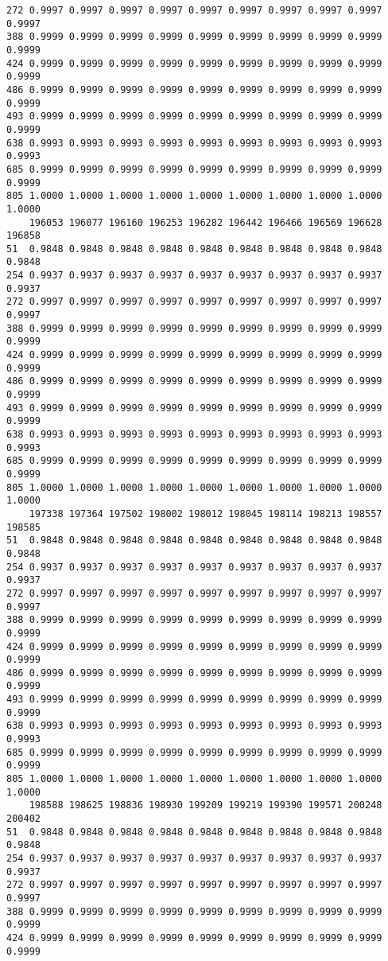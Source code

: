 \documentclass[
]{report}
\begin{document}
\begin{verbatim}
272 0.9997 0.9997 0.9997 0.9997 0.9997 0.9997 0.9997 0.9997 0.9997 0.9997
388 0.9999 0.9999 0.9999 0.9999 0.9999 0.9999 0.9999 0.9999 0.9999 0.9999
424 0.9999 0.9999 0.9999 0.9999 0.9999 0.9999 0.9999 0.9999 0.9999 0.9999
486 0.9999 0.9999 0.9999 0.9999 0.9999 0.9999 0.9999 0.9999 0.9999 0.9999
493 0.9999 0.9999 0.9999 0.9999 0.9999 0.9999 0.9999 0.9999 0.9999 0.9999
638 0.9993 0.9993 0.9993 0.9993 0.9993 0.9993 0.9993 0.9993 0.9993 0.9993
685 0.9999 0.9999 0.9999 0.9999 0.9999 0.9999 0.9999 0.9999 0.9999 0.9999
805 1.0000 1.0000 1.0000 1.0000 1.0000 1.0000 1.0000 1.0000 1.0000 1.0000
    196053 196077 196160 196253 196282 196442 196466 196569 196628 196858
51  0.9848 0.9848 0.9848 0.9848 0.9848 0.9848 0.9848 0.9848 0.9848 0.9848
254 0.9937 0.9937 0.9937 0.9937 0.9937 0.9937 0.9937 0.9937 0.9937 0.9937
272 0.9997 0.9997 0.9997 0.9997 0.9997 0.9997 0.9997 0.9997 0.9997 0.9997
388 0.9999 0.9999 0.9999 0.9999 0.9999 0.9999 0.9999 0.9999 0.9999 0.9999
424 0.9999 0.9999 0.9999 0.9999 0.9999 0.9999 0.9999 0.9999 0.9999 0.9999
486 0.9999 0.9999 0.9999 0.9999 0.9999 0.9999 0.9999 0.9999 0.9999 0.9999
493 0.9999 0.9999 0.9999 0.9999 0.9999 0.9999 0.9999 0.9999 0.9999 0.9999
638 0.9993 0.9993 0.9993 0.9993 0.9993 0.9993 0.9993 0.9993 0.9993 0.9993
685 0.9999 0.9999 0.9999 0.9999 0.9999 0.9999 0.9999 0.9999 0.9999 0.9999
805 1.0000 1.0000 1.0000 1.0000 1.0000 1.0000 1.0000 1.0000 1.0000 1.0000
    197338 197364 197502 198002 198012 198045 198114 198213 198557 198585
51  0.9848 0.9848 0.9848 0.9848 0.9848 0.9848 0.9848 0.9848 0.9848 0.9848
254 0.9937 0.9937 0.9937 0.9937 0.9937 0.9937 0.9937 0.9937 0.9937 0.9937
272 0.9997 0.9997 0.9997 0.9997 0.9997 0.9997 0.9997 0.9997 0.9997 0.9997
388 0.9999 0.9999 0.9999 0.9999 0.9999 0.9999 0.9999 0.9999 0.9999 0.9999
424 0.9999 0.9999 0.9999 0.9999 0.9999 0.9999 0.9999 0.9999 0.9999 0.9999
486 0.9999 0.9999 0.9999 0.9999 0.9999 0.9999 0.9999 0.9999 0.9999 0.9999
493 0.9999 0.9999 0.9999 0.9999 0.9999 0.9999 0.9999 0.9999 0.9999 0.9999
638 0.9993 0.9993 0.9993 0.9993 0.9993 0.9993 0.9993 0.9993 0.9993 0.9993
685 0.9999 0.9999 0.9999 0.9999 0.9999 0.9999 0.9999 0.9999 0.9999 0.9999
805 1.0000 1.0000 1.0000 1.0000 1.0000 1.0000 1.0000 1.0000 1.0000 1.0000
    198588 198625 198836 198930 199209 199219 199390 199571 200248 200402
51  0.9848 0.9848 0.9848 0.9848 0.9848 0.9848 0.9848 0.9848 0.9848 0.9848
254 0.9937 0.9937 0.9937 0.9937 0.9937 0.9937 0.9937 0.9937 0.9937 0.9937
272 0.9997 0.9997 0.9997 0.9997 0.9997 0.9997 0.9997 0.9997 0.9997 0.9997
388 0.9999 0.9999 0.9999 0.9999 0.9999 0.9999 0.9999 0.9999 0.9999 0.9999
424 0.9999 0.9999 0.9999 0.9999 0.9999 0.9999 0.9999 0.9999 0.9999 0.9999

\end{verbatim}
\end{document}

